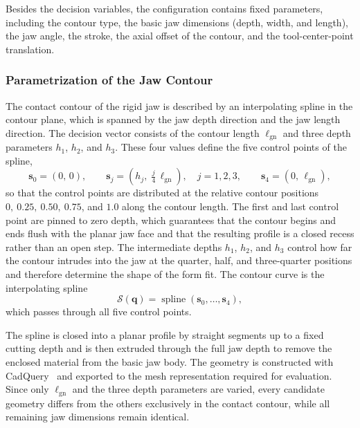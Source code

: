 Besides the decision variables, the configuration contains fixed parameters, including the contour
type, the basic jaw dimensions (depth, width, and length), the jaw angle, the stroke, the axial
offset of the contour, and the tool-center-point translation.

\subsubsection{Parametrization of the Jaw Contour}
\label{sec:jaw_contour_parametrization}

The contact contour of the rigid jaw is described by an interpolating spline in the contour plane,
which is spanned by the jaw depth direction and the jaw length direction. The decision vector
consists of the contour length $\ell_{\mathrm{gn}}$ and three depth parameters $h_1$, $h_2$, and
$h_3$. These four values define the five control points of the spline,
\begin{equation}
    \mathbf{s}_0 = (0,\,0),
    \qquad
    \mathbf{s}_j
    =
    \left(
        h_j,\;
        \tfrac{j}{4}\,\ell_{\mathrm{gn}}
    \right),
    \quad j = 1,2,3,
    \qquad
    \mathbf{s}_4 = (0,\,\ell_{\mathrm{gn}}),
\end{equation}
so that the control points are distributed at the relative contour positions
$0,\ 0.25,\ 0.50,\ 0.75$, and $1.0$ along the contour length. The first and last control point are
pinned to zero depth, which guarantees that the contour begins and ends flush with the planar jaw
face and that the resulting profile is a closed recess rather than an open step. The intermediate
depths $h_1$, $h_2$, and $h_3$ control how far the contour intrudes into the jaw at the quarter,
half, and three-quarter positions and therefore determine the shape of the form fit. The contour
curve is the interpolating spline
\begin{equation}
    \mathcal{S}(\mathbf{q})
    =
    \operatorname{spline}
    \left(
        \mathbf{s}_0,\ldots,\mathbf{s}_4
    \right),
\end{equation}
which passes through all five control points.

The spline is closed into a planar profile by straight segments up to a fixed cutting depth and is
then extruded through the full jaw depth to remove the enclosed material from the basic jaw body.
The geometry is constructed with CadQuery~\cite{cadquery2026} and exported to the mesh
representation required for evaluation. Since only $\ell_{\mathrm{gn}}$ and the three depth
parameters are varied, every candidate geometry differs from the others exclusively in the contact
contour, while all remaining jaw dimensions remain identical.

